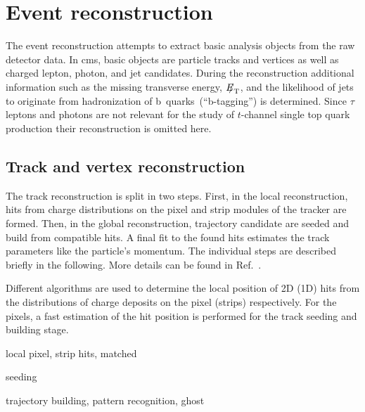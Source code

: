 \chapter{Event reconstruction}


The event reconstruction attempts to extract basic analysis objects from the raw detector data. In \gls{cms}, basic objects are particle tracks and vertices as well as charged lepton, photon, and jet candidates. During the reconstruction additional information such as the missing transverse energy, ${E\!\!\!/}_{\mathrm{T}}$, and the likelihood of jets to originate from hadronization of b~quarks~(``b-tagging'') is determined. Since $\tau$ leptons and photons are not relevant for the study of $t$-channel single top quark production their reconstruction is omitted here.


\section{Track and vertex reconstruction}

The track reconstruction is split in two steps. First, in the local reconstruction, hits from charge distributions on the pixel and strip modules of the tracker are formed. Then, in the global reconstruction, trajectory candidate are seeded and build from compatible hits. A final fit to the found hits estimates the track parameters like the particle's momentum. The individual steps are described briefly in the following. More details can be found in Ref.~\cite{Chatrchyan:2014fea}.

Different algorithms are used to determine the local position of 2D (1D) hits from the distributions of charge deposits on the pixel (strips) respectively. For the pixels, a fast estimation of the hit position is performed for the track seeding and building stage. 

local pixel, strip hits, matched

seeding

trajectory building, pattern recognition, ghost

